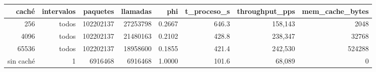 \begin{tabular}{rrrrrrrr}
\toprule
caché & intervalos & paquetes & llamadas & phi & t\_proceso\_s & throughput\_pps & mem\_cache\_bytes \\
\midrule
256 & todos & 102202137 & 27253798 & 0.2667 & 646.3 & 158,143 & 2048 \\
4096 & todos & 102202137 & 21480163 & 0.2102 & 428.8 & 238,347 & 32768 \\
65536 & todos & 102202137 & 18958600 & 0.1855 & 421.4 & 242,530 & 524288 \\
sin caché & 1 & 6916468 & 6916468 & 1.0000 & 101.6 & 68,089 & 0 \\
\bottomrule
\end{tabular}
